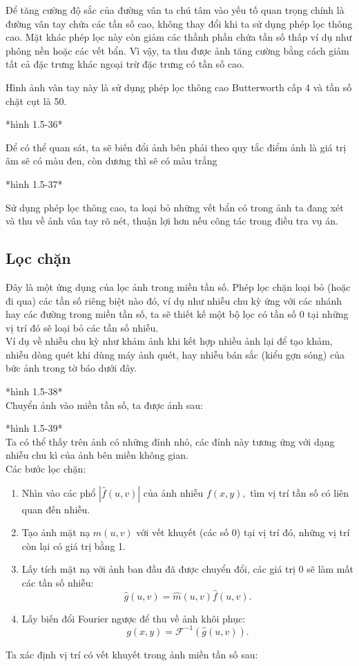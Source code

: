 \documentclass[12pt,a4paper]{report}
\numberwithin{equation}{section}
\theoremstyle{definition} %
\begin{document}
Để tăng cường độ sắc của đường vân ta chú tâm vào yếu tố quan trọng chính là đường vân tay chứa các tần số cao, không thay đổi khi ta sử dụng phép lọc thông cao. Mặt khác phép lọc này còn giảm các thầnh phần chứa tần số thấp ví dụ như phông nền hoặc các vết bẩn. Vì vậy, ta thu được ảnh tăng cường bằng cách giảm tất cả đặc trưng khác ngoại trừ đặc trưng có tần số cao.

Hình ảnh vân tay này là sử dụng phép lọc thông cao Butterworth cấp 4 và tần số chặt cụt là 50.

*hình 1.5-36*

Để có thể quan sát, ta sẽ biến đổi ảnh bên phải theo quy tắc điểm ảnh là giá trị âm sẽ có màu đen, còn dương thì sẽ có màu trắng

*hình 1.5-37*

Sử dụng phép lọc thông cao, ta loại bỏ những vết bẩn có trong ảnh ta đang xét và thu về ảnh vân tay rõ nét, thuận lợi hơn nếu công tác trong điều tra vụ án.
\subsection{Lọc chặn}
Đây là một ứng dụng của lọc ảnh trong miền tần số. Phép lọc chặn loại bỏ (hoặc đi qua) các tần số riêng biệt nào đó, ví dụ như nhiễu chu kỳ ứng với các nhánh hay các đường trong miền tần số, ta sẽ thiết kế một bộ lọc có tần số 0 tại những vị trí đó sẽ loại bỏ các tần số nhiễu.\\

Ví dụ về nhiễu chu kỳ như khảm ảnh khi kết hợp nhiều ảnh lại để tạo khảm, nhiễu dòng quét khi dùng máy ảnh quét, hay nhiễu bán sắc (kiểu gợn sóng) của bức ảnh trong tờ báo dưới đây.

*hình 1.5-38*\\

Chuyển ảnh vào miền tần số, ta được ảnh sau:

*hình 1.5-39*
\\

Ta có thể thấy trên ảnh có những đỉnh nhỏ, các đỉnh này tương ứng với dạng nhiễu chu kì của ảnh bên miền không gian.\\

Các bước lọc chặn:
\begin{enumerate}
    \item Nhìn vào các phổ $|\hat{f}(u,v)|$ của ảnh nhiễu $f(x,y),$ tìm vị trí tần số có liên quan đến nhiễu.
    \item Tạo ảnh mặt nạ $\widehat{m}(u,v)$ với vết khuyết (các số 0) tại vị trí đó, những vị trí còn lại có giá trị bằng 1.
    \item Lấy tích mặt nạ với ảnh ban đầu đã được chuyển đổi, các giá trị 0 sẽ làm mất các tần số nhiễu:
    $$\hat{g}(u,v)=\widehat{m}(u,v)\hat{f}(u,v).$$
    \item Lấy biến đổi Fourier ngược để thu về ảnh khôi phục:
    $$g(x,y)=\mathcal{F}^{-1}\left(\hat{g}(u,v)\right).$$

   
    
\end{enumerate}
 Ta xác định vị trí có vết khuyết trong ảnh miền tần số sau:
\end{document}
